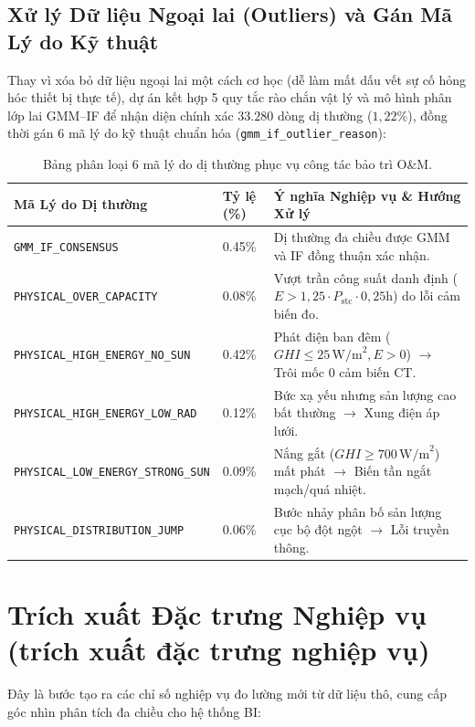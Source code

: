 \subsection{Xử lý Dữ liệu Ngoại lai (Outliers) và Gán Mã Lý do Kỹ thuật}
Thay vì xóa bỏ dữ liệu ngoại lai một cách cơ học (dễ làm mất dấu vết sự cố hỏng hóc thiết bị thực tế), dự án kết hợp 5 quy tắc rào chắn vật lý và mô hình phân lớp lai GMM--IF để nhận diện chính xác $33.280$ dòng dị thường ($1{,}22\%$), đồng thời gán 6 mã lý do kỹ thuật chuẩn hóa (\texttt{gmm\_if\_outlier\_reason}):

\begin{table}[H]
\centering
\small
\renewcommand{\arraystretch}{1.25}
\begin{tabularx}{\textwidth}{@{} l l X @{}}
\toprule
\textbf{Mã Lý do Dị thường} & \textbf{Tỷ lệ (\%)} & \textbf{Ý nghĩa Nghiệp vụ \& Hướng Xử lý} \\
\midrule
\texttt{GMM\_IF\_CONSENSUS} & 0.45\% & Dị thường đa chiều được GMM và IF đồng thuận xác nhận. \\
\texttt{PHYSICAL\_OVER\_CAPACITY} & 0.08\% & Vượt trần công suất danh định ($E > 1{,}25 \cdot P_{\text{stc}} \cdot 0{,}25\text{h}$) do lỗi cảm biến đo. \\
\texttt{PHYSICAL\_HIGH\_ENERGY\_NO\_SUN} & 0.42\% & Phát điện ban đêm ($GHI \le 25\,\text{W/m}^2, E > 0$) $\rightarrow$ Trôi mốc 0 cảm biến CT. \\
\texttt{PHYSICAL\_HIGH\_ENERGY\_LOW\_RAD} & 0.12\% & Bức xạ yếu nhưng sản lượng cao bất thường $\rightarrow$ Xung điện áp lưới. \\
\texttt{PHYSICAL\_LOW\_ENERGY\_STRONG\_SUN} & 0.09\% & Nắng gắt ($GHI \ge 700\,\text{W/m}^2$) mất phát $\rightarrow$ Biến tần ngắt mạch/quá nhiệt. \\
\texttt{PHYSICAL\_DISTRIBUTION\_JUMP} & 0.06\% & Bước nhảy phân bố sản lượng cục bộ đột ngột $\rightarrow$ Lỗi truyền thông. \\
\bottomrule
\end{tabularx}
\caption{Bảng phân loại 6 mã lý do dị thường phục vụ công tác bảo trì O\&M.}
\label{tab:outlier_reasons}
\end{table}

\section{Trích xuất Đặc trưng Nghiệp vụ (trích xuất đặc trưng nghiệp vụ)}
\label{sec:feature_engineering}

Đây là bước tạo ra các chỉ số nghiệp vụ đo lường mới từ dữ liệu thô, cung cấp góc nhìn phân tích đa chiều cho hệ thống BI:

